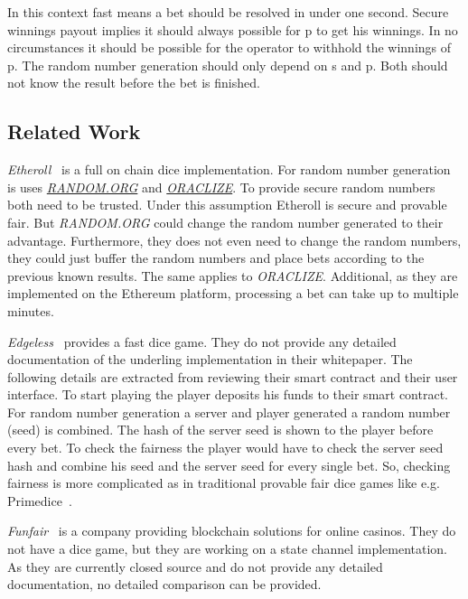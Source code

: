 \documentclass[oneside]{amsart}
\makeatletter
\newcommand*\eg{e.g.\@\xspace}
\makeatother
\begin{document}
\begin{multicols}{2}
In this context fast means a bet should be resolved in under one second.
Secure winnings payout implies it should always possible for \gls{p} to get his winnings.
In no circumstances it should be possible for the operator to withhold the winnings of \gls{p}.
The random number generation should only depend on \gls{s} and \gls{p}.
Both should not know the result before the bet is finished.

\subsection{Related Work}\label{subsec:related_work}
\emph{Etheroll}~\cite{Etheroll} is a full on chain dice implementation.
For random number generation is uses \href{https://random.org}{\emph{RANDOM.ORG}} and \href{https://oraclize.it}{\emph{ORACLIZE}}.
To provide secure random numbers both need to be trusted.
Under this assumption Etheroll is secure and provable fair.
But \emph{RANDOM.ORG} could change the random number generated to their advantage.
Furthermore, they does not even need to change the random numbers, they could just buffer the random numbers
and place bets according to the previous known results.
The same applies to \emph{ORACLIZE}.
Additional, as they are implemented on the Ethereum platform, processing a bet can take up to multiple minutes.

\emph{Edgeless}~\cite{Edgeless} provides a fast dice game.
They do not provide any detailed documentation of the underling implementation in their whitepaper.
The following details are extracted from reviewing their smart contract and their user interface.
To start playing the player deposits his funds to their smart contract.
For random number generation a server and player generated a random number (seed) is combined.
The hash of the server seed is shown to the player before every bet.
To check the fairness the player would have to check the server seed hash and combine his seed and the server seed
for every single bet.
So, checking fairness is more complicated as in traditional provable fair dice games like \eg Primedice~\cite{primedice}.

\emph{Funfair}~\cite{Funfair} is a company providing blockchain solutions for online casinos.
They do not have a dice game, but they are working on a state channel implementation.
As they are currently closed source and do not provide any detailed documentation, no detailed comparison
can be provided.


\end{multicols}
\end{document}
